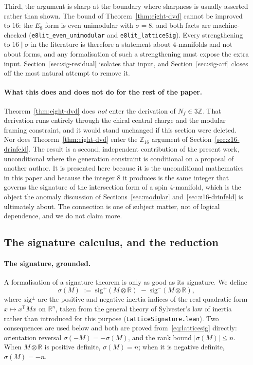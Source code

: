 Third, the argument is sharp at the boundary where sharpness is usually
asserted rather than shown. The bound of Theorem~\ref{thm:eight-dvd}
cannot be improved to $16$: the $E_8$ form is even unimodular with
$\sigma = 8$, and both facts are machine-checked
(\texttt{e8lit\_even\_unimodular} and \texttt{e8lit\_latticeSig}). Every
strengthening to $16 \mid \sigma$ in the literature is therefore a
statement about $4$-manifolds and not about forms, and any formalisation
of such a strengthening must expose the extra input.
Section~\ref{sec:sig-residual} isolates that input, and
Section~\ref{sec:sig-arf} closes off the most natural attempt to remove
it.

\paragraph{What this does and does not do for the rest of the paper.}
Theorem~\ref{thm:eight-dvd} does \emph{not} enter the derivation of
$N_f \in 3\mathbb{Z}$. That derivation runs entirely through the chiral
central charge and the modular framing constraint, and it would stand
unchanged if this section were deleted. Nor does
Theorem~\ref{thm:eight-dvd} enter the $\mathbb{Z}_{16}$ argument of
Section~\ref{sec:z16-drinfeld}. The result is a second, independent
contribution of the present work, unconditional where the generation
constraint is conditional on a proposal of another author. It is
presented here because it is the unconditional mathematics in this paper
and because the integer $8$ it produces is the same integer that governs
the signature of the intersection form of a spin $4$-manifold, which is
the object the anomaly discussion of Sections~\ref{sec:modular}
and~\ref{sec:z16-drinfeld} is ultimately about. The connection is one of
subject matter, not of logical dependence, and we do not claim more.

\subsection{The signature calculus, and the reduction}
\label{sec:sig-calculus}

\paragraph{The signature, grounded.}
A formalisation of a signature theorem is only as good as its signature.
We define
\begin{equation}
\sigma(M) \;:=\; \mathrm{sig}^{+}\!\left(M\otimes\mathbb{R}\right)
\;-\; \mathrm{sig}^{-}\!\left(M\otimes\mathbb{R}\right),
\label{eq:latticesig}
\end{equation}
where $\mathrm{sig}^{\pm}$ are the positive and negative inertia indices
of the real quadratic form $x \mapsto x^{\mathsf T} M x$ on
$\mathbb{R}^n$, taken from the general theory of Sylvester's law of
inertia rather than introduced for this purpose
(\texttt{LatticeSignature.lean}). Two consequences are used below and
both are proved from~\eqref{eq:latticesig} directly: orientation reversal
$\sigma(-M) = -\sigma(M)$, and the rank bound $|\sigma(M)| \leq n$. When
$M\otimes\mathbb{R}$ is positive definite, $\sigma(M) = n$; when it is
negative definite, $\sigma(M) = -n$.

